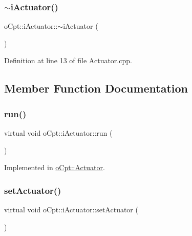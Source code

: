 \subsubsection{\texorpdfstring{$\sim$i\+Actuator()}{~iActuator()}}
{\footnotesize\ttfamily o\+Cpt\+::i\+Actuator\+::$\sim$i\+Actuator (\begin{DoxyParamCaption}{ }\end{DoxyParamCaption})\hspace{0.3cm}{\ttfamily [virtual]}}



Definition at line 13 of file Actuator.\+cpp.



\subsection{Member Function Documentation}
\hypertarget{classo_cpt_1_1i_actuator_abf4db1f9f6b59bdefc86ca44aed0f49a}{}\label{classo_cpt_1_1i_actuator_abf4db1f9f6b59bdefc86ca44aed0f49a} 
\subsubsection{\texorpdfstring{run()}{run()}}
{\footnotesize\ttfamily virtual void o\+Cpt\+::i\+Actuator\+::run (\begin{DoxyParamCaption}{ }\end{DoxyParamCaption})\hspace{0.3cm}{\ttfamily [pure virtual]}}



Implemented in \hyperlink{classo_cpt_1_1_actuator_a8985818fcfb644acce17ce50c5c7f86b}{o\+Cpt\+::\+Actuator}.

\hypertarget{classo_cpt_1_1i_actuator_a1654bf3167a1dd7c34f770180cd8aaa1}{}\label{classo_cpt_1_1i_actuator_a1654bf3167a1dd7c34f770180cd8aaa1} 
\subsubsection{\texorpdfstring{set\+Actuator()}{setActuator()}}
{\footnotesize\ttfamily virtual void o\+Cpt\+::i\+Actuator\+::set\+Actuator (\begin{DoxyParamCaption}{ }\end{DoxyParamCaption})\hspace{0.3cm}{\ttfamily [pure virtual]}}



